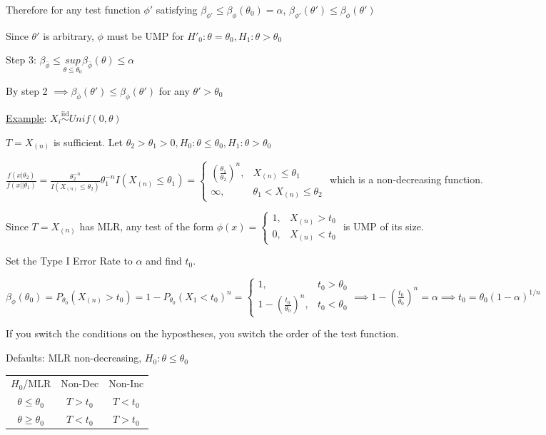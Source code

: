 \documentclass{article}
\newcommand{\iiddist}{\overset{\mathrm{iid}}{\sim}}
\begin{document}
Therefore for any test function $\phi'$ satisfying $\beta_{\phi'} \le \beta_{\phi}(\theta_0) = \alpha$, $\beta_{\phi'}(\theta') \le \beta_{\phi}(\theta')$

Since $\theta'$ is arbitrary, $\phi$ must be UMP for $H'_0: \theta = \theta_0, H_1: \theta > \theta_0$

Step 3: $\beta_{\bar{\phi}} \le \underset{\theta \le \theta_0}{sup}\beta_{\bar{\phi}}(\theta) \le \alpha$

By step 2 $\implies \beta_{\bar{\phi}}(\theta') \le \beta_{\phi}(\theta')$ for any $\theta' > \theta_0$

\underline{Example}: $X_i \iiddist Unif(0, \theta)$

$T = X_{(n)}$ is sufficient. Let $\theta_2 > \theta_1 > 0, H_0: \theta \le \theta_0, H_1: \theta > \theta_0$

$\frac{f(x|\theta_2)}{f(x||\theta_1)} = \frac{\theta_2^{-n}}{I(X_{(n)} \le \theta_2)}{\theta_1^{-n}}{I(X_{(n)} \le \theta_1)} = \begin{cases} (\frac{\theta_1}{\theta_2})^n, & X_{(n)} \le \theta_1 \\ \infty, & \theta_1 < X_{(n)} \le \theta_2 \end{cases}$ which is a non-decreasing function. 

Since $T = X_{(n)}$ has MLR, any test of the form $\phi(x) = \begin{cases} 1, & X_{(n)} > t_0 \\ 0, & X_{(n)} < t_0 \end{cases}$ is UMP of its size.

Set the Type I Error Rate to $\alpha$ and find $t_0$. 

$\beta_{\phi}(\theta_0)  = P_{\theta_0}(X_{(n)} > t_0) = 1 - P_{\theta_0}(X_1 < t_0)^n = \begin{cases} 1, & t_0 > \theta_0 \\ 1 - (\frac{t_0}{\theta_0})^n, & t_0 < \theta_0 \end{cases} \implies 1 - (\frac{t_0}{\theta_0})^n = \alpha \implies t_0 = \theta_0(1-\alpha)^{1/n}$

If you switch the conditions on the hypostheses, you switch the order of the test function. 

Defaults: MLR non-decreasing, $H_0: \theta \le \theta_0$

\begin{center}
\begin{tabular}{ c c c }
 $H_0$/MLR & Non-Dec & Non-Inc \\ 
 $\theta \le \theta_0$ & $T > t_0$ & $T < t_0$ \\  
 $\theta \ge \theta_0$ & $T < t_0$ & $T > t_0$    
\end{tabular}
\end{center}
\end{document}
